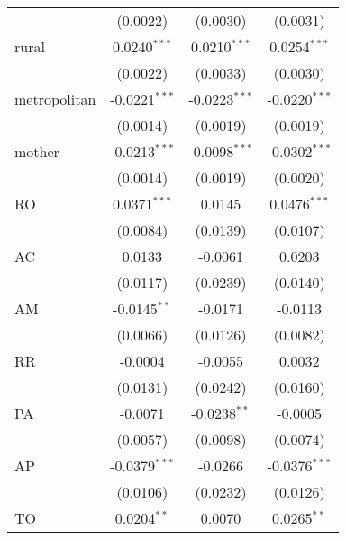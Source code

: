 \begin{tabular}{lccc}
                   & (0.0022)                       & (0.0030)                & (0.0031)\\   
   rural           & 0.0240$^{***}$                 & 0.0210$^{***}$          & 0.0254$^{***}$\\   
                   & (0.0022)                       & (0.0033)                & (0.0030)\\   
   metropolitan    & -0.0221$^{***}$                & -0.0223$^{***}$         & -0.0220$^{***}$\\   
                   & (0.0014)                       & (0.0019)                & (0.0019)\\   
   mother          & -0.0213$^{***}$                & -0.0098$^{***}$         & -0.0302$^{***}$\\   
                   & (0.0014)                       & (0.0019)                & (0.0020)\\   
   RO              & 0.0371$^{***}$                 & 0.0145                  & 0.0476$^{***}$\\   
                   & (0.0084)                       & (0.0139)                & (0.0107)\\   
   AC              & 0.0133                         & -0.0061                 & 0.0203\\   
                   & (0.0117)                       & (0.0239)                & (0.0140)\\   
   AM              & -0.0145$^{**}$                 & -0.0171                 & -0.0113\\   
                   & (0.0066)                       & (0.0126)                & (0.0082)\\   
   RR              & -0.0004                        & -0.0055                 & 0.0032\\   
                   & (0.0131)                       & (0.0242)                & (0.0160)\\   
   PA              & -0.0071                        & -0.0238$^{**}$          & -0.0005\\   
                   & (0.0057)                       & (0.0098)                & (0.0074)\\   
   AP              & -0.0379$^{***}$                & -0.0266                 & -0.0376$^{***}$\\   
                   & (0.0106)                       & (0.0232)                & (0.0126)\\   
   TO              & 0.0204$^{**}$                  & 0.0070                  & 0.0265$^{**}$\\   

\end{tabular}
